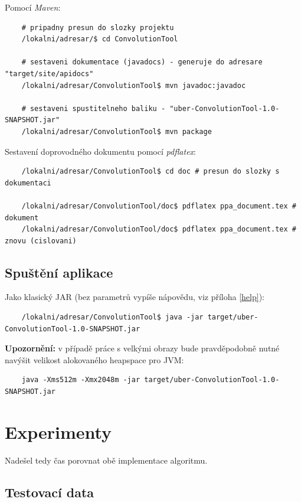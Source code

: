 \documentclass[10pt,a4paper]{article}
\begin{document}
	Pomocí \textit{Maven}:
	
    \begin{verbatim}
	# pripadny presun do slozky projektu
	/lokalni/adresar/$ cd ConvolutionTool
    
	# sestaveni dokumentace (javadocs) - generuje do adresare "target/site/apidocs"
	/lokalni/adresar/ConvolutionTool$ mvn javadoc:javadoc 
	
	# sestaveni spustitelneho baliku - "uber-ConvolutionTool-1.0-SNAPSHOT.jar"
	/lokalni/adresar/ConvolutionTool$ mvn package 
	\end{verbatim}    
    
	Sestavení doprovodného dokumentu pomocí \textit{pdflatex}:
	
	\begin{verbatim}
	/lokalni/adresar/ConvolutionTool$ cd doc # presun do slozky s dokumentaci
	
	/lokalni/adresar/ConvolutionTool/doc$ pdflatex ppa_document.tex # dokument
	/lokalni/adresar/ConvolutionTool/doc$ pdflatex ppa_document.tex # znovu (cislovani)
    \end{verbatim}  
    
\subsection{Spuštění aplikace} 

Jako klasický JAR (bez parametrů vypíše nápovědu, viz příloha \ref{help}):

	\begin{verbatim}
	/lokalni/adresar/ConvolutionTool$ java -jar target/uber-ConvolutionTool-1.0-SNAPSHOT.jar
	\end{verbatim} 

\label{heap_alert}
\textbf{Upozornění:} v případě práce s velkými obrazy bude pravděpodobně nutné navýšit velikost alokovaného heapspace pro JVM:

	\begin{verbatim}
	java -Xms512m -Xmx2048m -jar target/uber-ConvolutionTool-1.0-SNAPSHOT.jar
	\end{verbatim}

\section{Experimenty}

Nadešel tedy čas porovnat obě implementace algoritmu.

\subsection{Testovací data}
\end{document}
